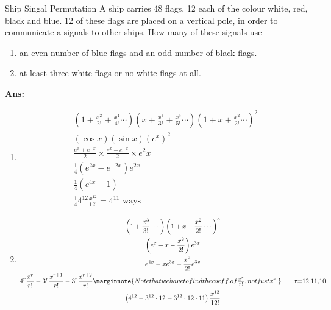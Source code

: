 \begin{exampletcb}{Ship Singal Permutation}{}
    A ship carries 48 flags, 12 each of the colour white, red, black and blue. 12 of these flags are placed on a vertical pole, in order to communicate a signals to other ships. How many of these signals use\begin{enumerate}
        \item an even number of blue flags and an odd number of black flags.
        \item at least three white flags or no white flags at all.
    \end{enumerate}
    \textbf{Ans:}\begin{enumerate}
        \item \begin{gather*}
                  \left(1 + \frac{x^2}{2!} + \frac{x^4}{4!} \cdots \right) \left(x + \frac{x^3}{3!} + \frac{x^5}{5!}\cdots\right) {\left(1 + x +\frac{x^2}{2!} \cdots\right)}^2\\
                  (\cos x) (\sin x) {(e^x)}^2 \\
                  \frac{e^x + e^{ - x}}{2} \times  \frac{e^x - e^{-x}}{2} \times  e^2x\\
                  \frac{1}{4} (e^{2x} - e^{ - 2x}) e^{2x}\\
                  \frac{1}{4} (e^{4x} - 1) \tag*{r = 12}\\
                  \frac{1}{4} 4^{12} \frac{x^{12}}{12!} = 4^{11} \text{ ways}
              \end{gather*}

        \item \begin{gather*}
                  \left( 1 + \frac{x^{3}}{3!} \cdots \right) {\left( 1 + x + \frac{x^{2}}{2!} \cdots \right)}^3\\
                  \left( e^x - x - \frac{x^2}{2!}\right) e^{3x}\\
                  e^{4x} - xe^{3x} - \frac{x^2}{2!} e^{3x} \\
                  4^r \frac{x^r}{r!} - 3^r \frac{x^{r+1}}{r!} - 3^r \frac{x^{r+2}}{r!} \marginnote{Note that we have to find the coeff. of \mbox{\(\frac{x^r}{r!}\)}, not just \mbox{\(x^r\)}.} \tag*{r=12,11,10} \\
                  \left( 4^{12} - 3^{12} \cdot 12 - 3^{12} \cdot 12 \cdot 11  \right) \frac{x^{12}}{12!} 
              \end{gather*}
    \end{enumerate}
\end{exampletcb}




